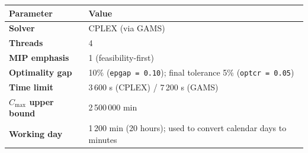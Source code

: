 \documentclass[11pt,a4paper]{article}
\begin{document}
\begin{tabularx}{\linewidth}{>{\bfseries}l X}
  \toprule
  \rowcolor{lightblue}
  Parameter & Value \\
  \midrule
  Solver         & CPLEX (via GAMS) \\
  \rowcolor{rowgray}
  Threads        & 4 \\
  MIP emphasis   & 1 (feasibility-first) \\
  \rowcolor{rowgray}
  Optimality gap & 10\% (\texttt{epgap = 0.10}); final tolerance 5\% (\texttt{optcr = 0.05}) \\
  Time limit     & 3\,600 s (CPLEX) / 7\,200 s (GAMS) \\
  \rowcolor{rowgray}
  $C_{\max}$ upper bound & 2\,500\,000 min \\
  Working day    & 1\,200 min (20 hours); used to convert calendar days to minutes \\
  \bottomrule
\end{tabularx}
\end{document}
